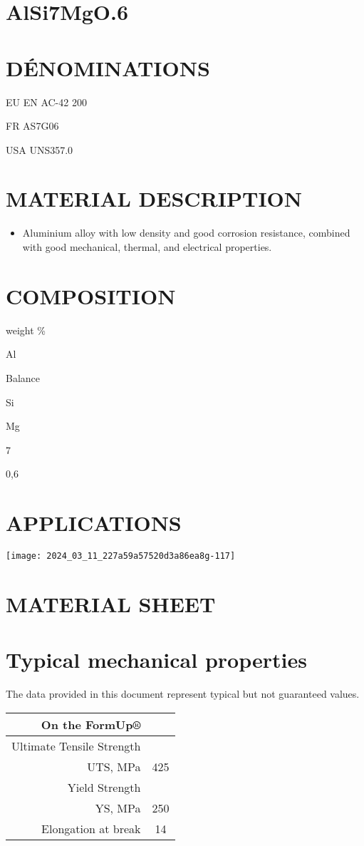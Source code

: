 \documentclass[10pt]{article}
\begin{document}
\section*{AlSi7MgO.6}
\section*{DÉNOMINATIONS}
EU EN AC-42 200

FR AS7G06

USA UNS357.0

\section*{MATERIAL DESCRIPTION}
\begin{itemize}
  \item Aluminium alloy with low density and good corrosion resistance, combined with good mechanical, thermal, and electrical properties.
\end{itemize}

\section*{COMPOSITION}
weight \%

Al

Balance

Si

Mg

7

0,6

\section*{APPLICATIONS}
\begin{center}
\texttt{[image: 2024\_03\_11\_227a59a57520d3a86ea8g-117]}
\end{center}

\section*{MATERIAL SHEET}
\section*{Typical mechanical properties}
The data provided in this document represent typical but not guaranteed values.

\begin{center}
\begin{tabular}{|rc|}
\hline
On the FormUp® &  \\
\hline
Ultimate Tensile Strength &  \\
UTS, MPa & 425 \\
\hline
Yield Strength &  \\
YS, MPa & 250 \\
\hline
Elongation at break & 14 \\
\hline
\end{tabular}
\end{center}
\end{document}
